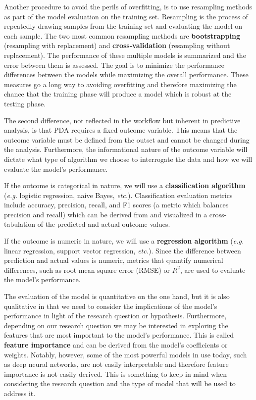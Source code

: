 \documentclass[
  letterpaper,
  krantz1]{latex/krantz-mod}
\theoremstyle{definition}
\theoremstyle{definition}
\theoremstyle{remark}
\begin{document}
Another procedure to avoid the perils of overfitting, is to use
resampling methods as part of the model evaluation on the training set.
Resampling is the process of repeatedly drawing
samples from the training set and evaluating the model on each sample.
The two most common resampling methods are
\textbf{bootstrapping} (resampling with
replacement) and \textbf{cross-validation}
(resampling without replacement). The performance of these multiple
models is summarized and the error between them is assessed. The goal is
to minimize the performance differences between the models while
maximizing the overall performance. These measures go a long way to
avoiding overfitting and therefore maximizing the chance that the
training phase will produce a model which is robust at the testing
phase.

The second difference, not reflected in the workflow but inherent in
predictive analysis, is that PDA requires a fixed outcome
variable. This means that the outcome variable
must be defined from the outset and cannot be changed during the
analysis. Furthermore, the informational nature of the outcome variable
will dictate what type of algorithm we choose to interrogate the data
and how we will evaluate the model's performance.

If the outcome is categorical in nature, we will use a
\textbf{classification algorithm}
(\emph{e.g.} logistic regression, naive Bayes, \emph{etc.}).
Classification evaluation metrics include accuracy, precision, recall,
and F1 scores (a metric which balances precision and recall) which can
be derived from and visualized in a cross-tabulation of the predicted
and actual outcome values.

If the outcome is numeric in nature, we will use a \textbf{regression
algorithm} (\emph{e.g.} linear regression,
support vector regression, \emph{etc.}). Since the difference between
prediction and actual values is numeric, metrics that quantify numerical
differences, such as root mean square error (RMSE) or \(R^2\), are used
to evaluate the model's performance.

The evaluation of the model is quantitative on the one hand, but it is
also qualitative in that we need to consider the implications of the
model's performance in light of the research question or hypothesis.
Furthermore, depending on our research question we may be interested in
exploring the features that are most important to the model's
performance. This is called \textbf{feature
importance} and can be derived from the
model's coefficients or weights. Notably, however, some of the most
powerful models in use today, such as deep neural networks, are not
easily interpretable and therefore feature importance is not easily
derived. This is something to keep in mind when considering the research
question and the type of model that will be used to address
it.
\end{document}
